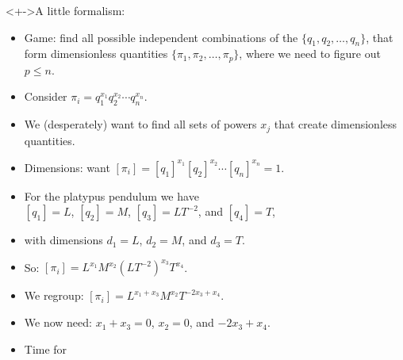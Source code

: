 \begin{frame}
  \small

  \begin{block}<+->{A little formalism:}
    \begin{itemize}
    \item<+-> 
      Game: find all possible independent combinations of the
      $\{q_1, q_2, \ldots, q_n\}$,
      that form dimensionless quantities
      $\{\pi_1, \pi_2, \ldots, \pi_p\}$,
      where we need to figure out $p \le n$.
    \item<+-> 
      Consider 
      $
      \pi_i 
      = 
      q_1^{x_{1}} 
      q_2^{x_{2}} 
      \cdots
      q_n^{x_{n}} 
      $.
    \item<+->
      We (desperately) want to find all sets of powers $x_{j}$ that create dimensionless quantities.
    \item<+-> 
      Dimensions:
      want
      $
      [\pi_i]
      = 
      [q_1]^{x_{1}} 
      [q_2]^{x_{2}} 
      \cdots
      [q_n]^{x_{n}} 
      = 
      1
      $.
    \item<+->
      For the platypus pendulum we have \\
      $[q_1] = L$, $[q_2] = M$, $[q_3] = L T^{-2}$, and $[q_4] = T$,\\
    \item<+->[]
      with dimensions
      $d_1=L$, $d_2=M$, and $d_3=T$.
    \item<+->
      So:
      $
      [\pi_i]
      =
      L^{x_{1}}
      M^{x_{2}}
      (LT^{-2})^{x_{3}}
      T^{x_{4}}
      $.
    \item<+->
      We regroup:
      $
      [\pi_i]
      =
      L^{x_{1} + x_{3}}
      M^{x_{2}}
      T^{-2x_{3} + x_{4}}
      $.
    \item<+->
      We now need:
      $x_{1} + x_{3} = 0$,
      $x_{2} =  0$,
      and
      $-2x_{3} + x_{4}$.
    \item<+->
      Time for 
    \end{itemize}
  \end{block}

\end{frame}

